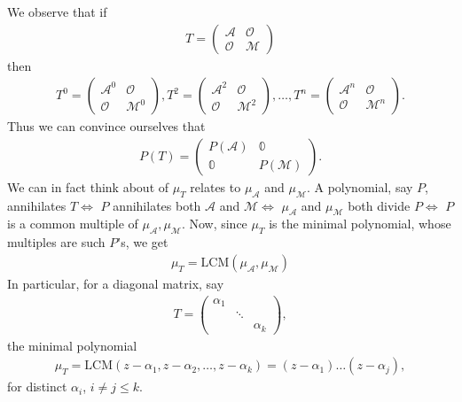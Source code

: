\documentclass{book}
\theoremstyle{definition}
\newcommand{\A}{\mathcal{A}}
\newcommand{\M}{\mathcal{M}}
\begin{document}
We observe that if
\begin{align*}
T = \begin{pmatrix}
\A & \mathcal{O}\\
\mathcal{O} & \M
\end{pmatrix}
\end{align*}
then
\begin{align*}
T^0 = \begin{pmatrix}
\A^0 & \mathcal{O}\\
\mathcal{O} & \M^0
\end{pmatrix}, 
T^2 = \begin{pmatrix}
\A^2 & \mathcal{O}\\
\mathcal{O} & \M^2
\end{pmatrix}, 
\dots,
T^n = \begin{pmatrix}
\A^n & \mathcal{O}\\
\mathcal{O} & \M^n
\end{pmatrix}.
\end{align*}
Thus we can convince ourselves that
\begin{align*}
P(T) = \begin{pmatrix}
P(\A) & \mathbb{0}\\
\mathbb{0} & P(\M)
\end{pmatrix}.
\end{align*}
We can in fact think about of $\mu_T$ relates to $\mu_\A$ and $\mu_\M$. A polynomial, say $P$, annihilates $T \iff$ $P$ annihilates both $\A$ and $\M \iff$ $\mu_\A$ and $\mu_\M$ both divide $P \iff$ $P$ is a common multiple of $\mu_\A, \mu_\M$. Now, since $\mu_T$ is the minimal polynomial, whose multiples are such $P$'s, we get
\begin{align*}
\boxed{\mu_T = \text{LCM}(\mu_\A, \mu_\M)}
\end{align*}  
In particular, for a diagonal matrix, say
\begin{align*}
T = \begin{pmatrix}
\alpha_1 & & \\
& \ddots & \\
& & \alpha_k
\end{pmatrix},
\end{align*}
the minimal polynomial 
\begin{align*}
\mu_T = \text{LCM}(z-\alpha_1, z-\alpha_2, \dots, z-\alpha_k) = (z- \alpha_1)\dots(z-\alpha_j),
\end{align*}
for distinct $\alpha_i$, $i\neq j \leq k$.
\end{document}
